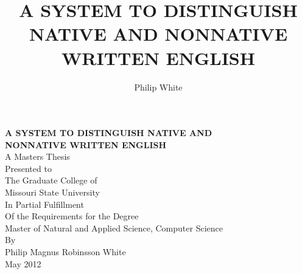 \documentclass[12pt]{article}
\title{\textbf{A SYSTEM TO DISTINGUISH NATIVE AND NONNATIVE WRITTEN ENGLISH}}
\author{Philip White}
\def\biblio{}
\let\stdsection\section
\renewcommand\section{\clearpage\stdsection}
\begin{document}
\def\biblio{} %


{}
\begin{titlepage}

\centering

\textbf{A SYSTEM TO DISTINGUISH NATIVE AND\\NONNATIVE WRITTEN ENGLISH}\\

\null\null
A Masters Thesis\\
Presented to\\
The Graduate College of\\
Missouri State University\\
\null\null\null\null
In Partial Fulfillment\\
Of the Requirements for the Degree\\
Master of Natural and Applied Science, Computer Science\\
\null\null\null\null
By\\
Philip Magnus Robinsson White\\
May 2012

\end{titlepage}
\setcounter{page}{2}

\newpage


\singlespacing
\tableofcontents

\doublespacing
\listoftables
\listoffigures

\doublespacing
\newpage
{}
\setcounter{page}{1}
\setcounter{secnumdepth}{-1}

\titleformat{\section}{\normalfont\bfseries\centering}{}{}{\MakeUppercase}
\titleformat{\subsection}{\normalfont\bfseries}{}{}{}
\titlespacing*{\subsection}{0pt}{24pt}{0pt}




\end{document}
